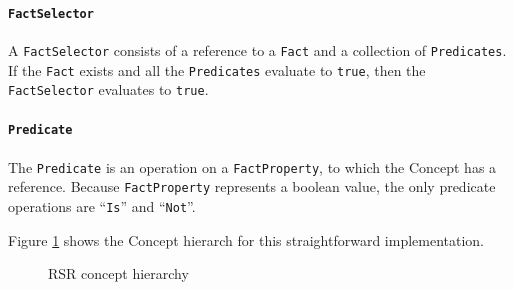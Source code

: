 \paragraph{\texttt{FactSelector}} A \texttt{FactSelector} consists of a reference to a \texttt{Fact} and a collection of \texttt{Predicates}.
If the \texttt{Fact} exists and all the \texttt{Predicates} evaluate to \texttt{true}, then the \texttt{FactSelector} evaluates to \texttt{true}.

\paragraph{\texttt{Predicate}} The \texttt{Predicate} is an operation on a \texttt{FactProperty}, to which the Concept has a reference.
Because \texttt{FactProperty} represents a boolean value, the only predicate operations are ``\texttt{Is}'' and ``\texttt{Not}''.

Figure \ref{fig:RSRDiagram} shows the Concept hierarch for this straightforward implementation.

\begin{figure}[h]
    \centering
    \caption{RSR concept hierarchy}
    \label{fig:RSRDiagram}
\end{figure}

